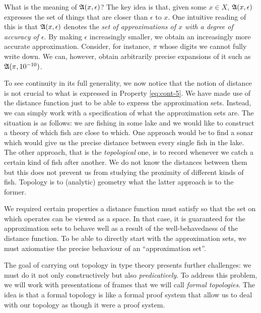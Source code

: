What is the meaning of $\mathfrak{A}(x, \epsilon)$? The key idea is that, given some $x \in X$,
$\mathfrak{A}(x, \epsilon)$ expresses the set of things that are closer than $\epsilon$ to $x$. One intuitive
reading of this is that $\mathfrak{A}(x, \epsilon)$ denotes the \emph{set of approximations of $x$ with
a degree of accuracy of $\epsilon$}. By making $\epsilon$ increasingly smaller, we obtain an
increasingly more accurate approximation. Consider, for instance, $\pi$ whose digits we
cannot fully write down. We can, however, obtain arbitrarily precise expansions of it such
as $\mathfrak{A}(\pi, 10^{-10})$.

To see continuity in its full generality, we now notice that the notion of distance is not
crucial to what is expressed in Property \ref{eq:cont-5}. We have made use of the distance
function just to be able to express the approximation sets. Instead, we can simply work
with a specification of what the approximation sets are. The situation is as follows: we
are fishing in some lake and we would like to construct a theory of which fish are close
to which. One approach would be to find a sonar which would give us the precise distance
between every single fish in the lake. The other approach, that is the \emph{topological}
one, is to record whenever we catch a certain kind of fish after another. We do not know
the distances between them but this does not prevent us from studying the proximity of
different kinds of fish. Topology is to (analytic) geometry what the latter approach is to
the former.

We required certain properties a distance function must satisfy so that the set on which
operates can be viewed as a space. In that case, it is guaranteed for the approximation
sets to behave well as a result of the well-behavedness of the distance function. To be
able to directly start with the approximation sets, we must axiomatise the precise
behaviour of an ``approximation set''.



The goal of carrying out topology in type theory presents further challenges: we must do
it not only constructively but also \emph{predicatively}. To address this problem, we will
work with presentations of frames that we will call \emph{formal topologies}. The idea is
that a formal topology is like a formal proof system that allow us to deal with our
topology as though it were a proof system.

